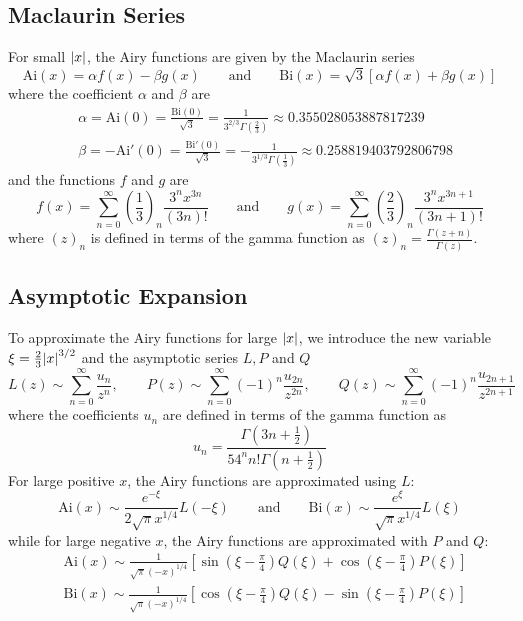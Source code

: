 \documentclass[11pt, a4paper]{article}
\newcommand{\eqtext}[1]{\qquad \text{#1} \qquad}
\newcommand{\Ai}{\mathrm{Ai}}
\newcommand{\Bi}{\mathrm{Bi}}
\begin{document}
\subsection{Maclaurin Series}
For small $ \abs{x} $, the Airy functions are given by the Maclaurin series
\begin{equation}
	\Ai(x) = \alpha f(x) - \beta g(x) \eqtext{and} \Bi(x) = \sqrt{3}\left[\alpha f(x) + \beta g(x)\right] \label{airy:eq:maclaurin}
\end{equation}
where the coefficient $ \alpha $ and $ \beta $ are
\begin{align*}
	&\alpha = \Ai(0) = \frac{\Bi(0)}{\sqrt{3}} = \frac{1}{3^{2/3}\Gamma(\tfrac{2}{3})} \approx 0.355028053887817239 \\
	&\beta = -\Ai'(0) = \frac{\Bi'(0)}{\sqrt{3}} = -\frac{1}{3^{1/3}\Gamma(\tfrac{1}{3})} \approx 0.258819403792806798 
\end{align*}
and the functions $ f $ and $ g $ are
\begin{equation}
	f(x) = \sum_{n=0}^{\infty}\left(\frac{1}{3}\right)_{n}\frac{3^{n}x^{3n}}{(3n)!} \eqtext{and} g(x) = \sum_{n=0}^{\infty}\left(\frac{2}{3}\right)_{n}\frac{3^{n}x^{3n+1}}{(3n+1)!} \label{airy:eq:fg}
\end{equation}
where $ (z)_{n} $ is defined in terms of the gamma function as $ (z)_{n} = \frac{\Gamma(z+n)}{\Gamma(z)} $.


\subsection{Asymptotic Expansion} \label{airy:ss:asymptotic_expansion}
To approximate the Airy functions for large $ \abs{x} $, we introduce the new variable $ \xi = \frac{2}{3}\abs{x}^{3/2}$ and the asymptotic series $ L, P $ and $ Q $
\begin{equation}
	L(z) \sim \sum_{n=0}^{\infty}\frac{u_{n}}{z^{n}}, \qquad P(z) \sim \sum_{n=0}^{\infty}(-1)^{n}\frac{u_{2n}}{z^{2n}}, \qquad Q(z) \sim \sum_{n=0}^{\infty}(-1)^{n}\frac{u_{2n+1}}{z^{2n+1}} \label{airy:eq:LPQ}
\end{equation}
where the coefficients $ u_{n} $ are defined in terms of the gamma function as
\begin{equation*}
	u_{n} = \frac{\Gamma\left(3n+\tfrac{1}{2}\right)}{54^{n}n!\Gamma\left(n + \tfrac{1}{2}\right)}
\end{equation*}
For large positive $ x $, the Airy functions are approximated using $ L$:
\begin{equation}
	\Ai(x) \sim \frac{e^{-\xi}}{2\sqrt{\pi} x^{1/4}}L(-\xi) \eqtext{and} \Bi(x) \sim \frac{e^{\xi}}{\sqrt{\pi} x^{1/4}}L(\xi) \label{airy:eq:asym_negative_x}
\end{equation}
while for large negative $ x $, the Airy functions are approximated with $ P $ and $ Q $:
\begin{align}
	&\Ai(x) \sim \frac{1}{\sqrt{\pi}(-x)^{1/4}}\left[\sin(\xi - \frac{\pi}{4})Q(\xi) + \cos(\xi - \frac{\pi}{4})P(\xi)\right] \label{airy:eq:asym_Ai_positive_x}\\
	&\Bi(x) \sim \frac{1}{\sqrt{\pi}(-x)^{1/4}}\left[\cos(\xi - \frac{\pi}{4})Q(\xi) - \sin(\xi - \frac{\pi}{4})P(\xi)\right] \label{airy:eq:asym_Bi_positive_x}
\end{align}
\end{document}
